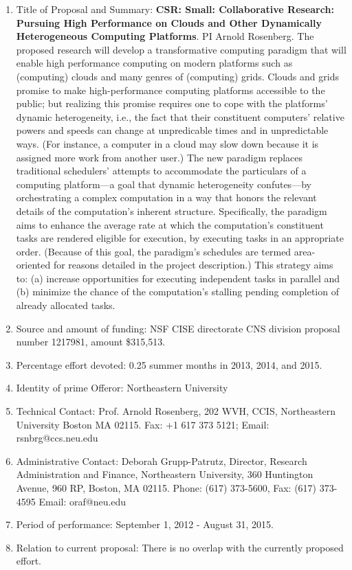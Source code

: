 \begin{enumerate}
\item Title of Proposal and Summary: {\bf CSR: Small: Collaborative
  Research: Pursuing High Performance on Clouds and Other Dynamically
  Heterogeneous Computing Platforms}. PI Arnold Rosenberg.  The
  proposed research will develop a transformative computing paradigm
  that will enable high performance computing on modern platforms such
  as (computing) clouds and many genres of (computing) grids. Clouds
  and grids promise to make high-performance computing platforms
  accessible to the public; but realizing this promise requires one to
  cope with the platforms’ dynamic heterogeneity, i.e., the fact that
  their constituent computers’ relative powers and speeds can change
  at unpredicable times and in unpredictable ways. (For instance, a
  computer in a cloud may slow down because it is assigned more work
  from another user.) The new paradigm replaces traditional
  schedulers’ attempts to accommodate the particulars of a computing
  platform—a goal that dynamic heterogeneity confutes—by orchestrating
  a complex computation in a way that honors the relevant details of
  the computation’s inherent structure. Specifically, the paradigm
  aims to enhance the average rate at which the computation’s
  constituent tasks are rendered eligible for execution, by executing
  tasks in an appropriate order. (Because of this goal, the paradigm’s
  schedules are termed area-oriented for reasons detailed in the
  project description.) This strategy aims to: (a) increase
  opportunities for executing independent tasks in parallel and (b)
  minimize the chance of the computation’s stalling pending completion
  of already allocated tasks.
\item Source and amount of funding: NSF CISE directorate CNS division
  proposal number 1217981, amount \$315,513.
\item Percentage effort devoted: 0.25 summer months in 2013, 2014, and 2015.
\item Identity of prime Offeror: Northeastern University
\item Technical Contact: Prof. Arnold Rosenberg,  202 WVH, CCIS, Northeastern University
Boston MA 02115. Fax: +1 617 373 5121;  Email: rsnbrg@ccs.neu.edu
\item Administrative Contact: Deborah Grupp-Patrutz, Director,
  Research Administration and Finance, Northeastern University, 360
  Huntington Avenue, 960 RP, Boston, MA 02115. Phone: (617) 373-5600,
  Fax: (617) 373-4595 Email: oraf@neu.edu
\item  Period of performance: September 1, 2012 - August 31, 2015.
\item Relation to current proposal: There is no overlap with the currently proposed effort.
\end{enumerate}
